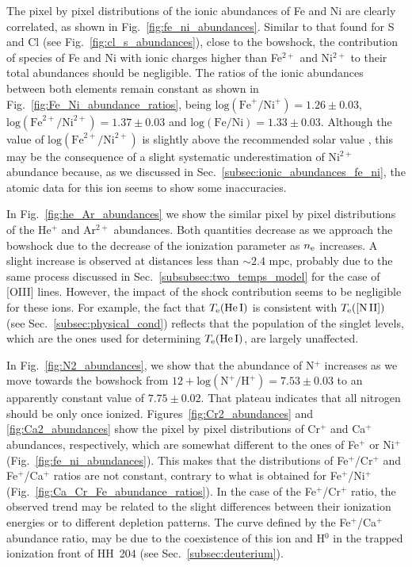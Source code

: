 \documentclass[twocolumn,linenumbers]{aastex63}
\begin{document}
The pixel by pixel distributions of the ionic abundances of Fe and Ni are clearly correlated, as shown in Fig.~\ref{fig:fe_ni_abundances}. Similar to that found for S and Cl (see Fig.~\ref{fig:cl_s_abundances}), close to the bowshock, the contribution of species of Fe and Ni with ionic charges higher than Fe$^{2+}$ and Ni$^{2+}$ to their total abundances should be negligible. The ratios of the ionic abundances between both elements remain constant as shown in Fig.~\ref{fig:Fe_Ni_abundance_ratios}, being $\text{log}(\text{Fe}^{+}/\text{Ni}^{+})=1.26\pm 0.03$, $\text{log}(\text{Fe}^{2+}/\text{Ni}^{2+})=1.37\pm 0.03$ and $\text{log}(\text{Fe}/\text{Ni})=1.33\pm 0.03$. Although the value of $\text{log}(\text{Fe}^{2+}/\text{Ni}^{2+})$ is slightly above the recommended solar value \citep[$\text{log}(\text{Fe}/\text{Ni})_{\odot}=1.25\pm 0.05$,][]{lodders19}, this may be the consequence of a slight systematic underestimation of Ni$^{2+}$ abundance because, as we discussed in Sec.~\ref{subsec:ionic_abundances_fe_ni}, the atomic data for this ion seems to show some inaccuracies. 

In Fig.~\ref{fig:he_Ar_abundances} we show the similar pixel by pixel distributions of the He$^{+}$ and Ar$^{2+}$ abundances. Both quantities decrease as we approach the bowshock due to the decrease of the ionization parameter as $n_{\rm e}$ increases. A slight increase is observed at distances less than $\sim 2.4  \text{ mpc}$, probably due to the same process discussed in Sec.~\ref{subsubsec:two_temps_model} for the case of [O\thinspace III] lines. However, the impact of the shock contribution seems to be negligible for these ions. For example, the fact that $T_{\rm e}(\text{He\thinspace I})$ is consistent with $T_{\rm e}(\text{[N\thinspace II]})$ (see Sec.~\ref{subsec:physical_cond}) reflects that the population of the singlet levels, which are the ones used for determining $T_{\rm e}(\text{He\thinspace I})$, are largely unaffected.


In Fig.~\ref{fig:N2_abundances}, we show that the abundance of N$^+$ increases as we move towards the bowshock from $12+\text{log}(\text{N}^{+}/\text{H}^{+})=7.53\pm 0.03$ to an apparently constant value of $7.75\pm 0.02$. That plateau indicates that all nitrogen should be only once ionized. Figures~\ref{fig:Cr2_abundances} and \ref{fig:Ca2_abundances} show the pixel by pixel distributions of Cr$^+$ and Ca$^{+}$ abundances, respectively, which are somewhat different to the ones of Fe$^{+}$ or Ni$^{+}$ (Fig.~\ref{fig:fe_ni_abundances}). This makes that the distributions of  Fe$^{+}$/Cr$^{+}$ and Fe$^{+}$/Ca$^{+}$ ratios are not constant, contrary to what is obtained for Fe$^{+}$/Ni$^{+}$ (Fig.~\ref{fig:Ca_Cr_Fe_abundance_ratios}). In the case of the Fe$^{+}$/Cr$^{+}$ ratio, the observed trend may be related to the slight differences between their ionization energies or to different depletion patterns. The curve defined by the Fe$^{+}$/Ca$^{+}$ abundance ratio, may be due to the coexistence of this ion and H$^{0}$ in the trapped ionization front of HH~204 (see Sec.~\ref{subsec:deuterium}). 
\end{document}
